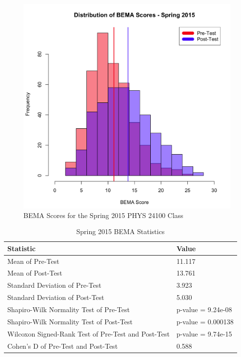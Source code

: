 \begin{figure}
	\centering
	\includegraphics[width=5in]{img/chapter4/bema_spring_2015}
	\caption{BEMA Scores for the Spring 2015 PHYS 24100 Class}
  \label{fig:bemaSp15}
\end{figure}

\pagebreak\clearpage

\begin{small}
\begin{table}
  \centering
  \begin{tabular}{|l|l|}
    \hline
    \textbf{Statistic} & \textbf{Value}\\
	\hline
	Mean of Pre-Test & 11.117 \\
	\hline
	Mean of Post-Test & 13.761 \\
	\hline
	Standard Deviation of Pre-Test & 3.923 \\
	\hline
	Standard Deviation of Post-Test & 5.030 \\
	\hline
	Shapiro-Wilk Normality Test of Pre-Test & p-value = 9.24e-08 \\
	\hline
	Shapiro-Wilk Normality Test of Post-Test & p-value = 0.000138 \\
	\hline
	Wilcoxon Signed-Rank Test of Pre-Test and Post-Test & p-value = 9.74e-15 \\
	\hline
	Cohen's D of Pre-Test and Post-Test & 0.588 \\
	\hline
  \end{tabular}
  \caption{Spring 2015 BEMA Statistics}
  \label{tab:statsSp15}
\end{table}
\end{small}

